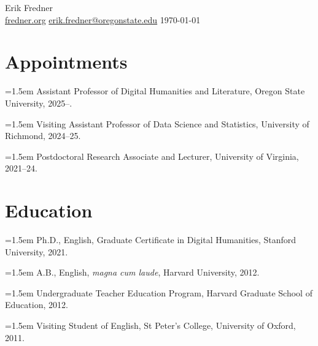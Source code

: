 \documentclass[12pt, letterpaper]{article}
\newcommand{\entry}[1]{\hangindent=1.5em\hangafter=1 #1\par}
\newenvironment{tight}{\setlength{\parskip}{0pt}}{}
\begin{document}
\begin{center}
    {\Large{Erik Fredner}} \\
    {\color{gray} \footnotesize \href{https://fredner.org}{fredner.org} \textperiodcentered{} \href{mailto:erik.fredner@oregonstate.edu}{erik.fredner@oregonstate.edu} \textperiodcentered{} \today}
\end{center}

\section{Appointments}
\begin{tight}
\entry{Assistant Professor of Digital Humanities and Literature, Oregon State University, 2025--.}
\entry{Visiting Assistant Professor of Data Science and Statistics, University of Richmond, 2024--25.}
\entry{Postdoctoral Research Associate and Lecturer, University of Virginia, 2021--24.}
\end{tight}

\section{Education}
\begin{tight}
\entry{Ph.D., English, Graduate Certificate in Digital Humanities, Stanford University, 2021.}
\entry{A.B., English, \textit{magna cum laude}, Harvard University, 2012.}
\entry{Undergraduate Teacher Education Program, Harvard Graduate School of Education, 2012.}
\entry{Visiting Student of English, St Peter's College, University of Oxford, 2011.}
\end{tight}

\end{document}
